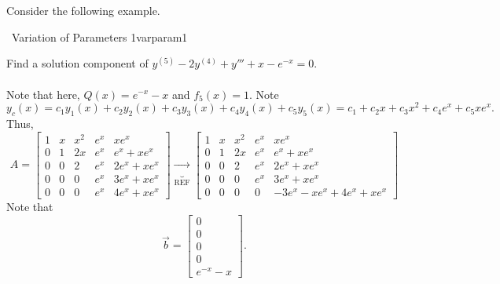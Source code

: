         \\
        \\
        Consider the following example.
        \begin{example}{\Difficulty\,\Difficulty\,\,Variation of Parameters 1}{varparam1}

            Find a solution component of \(y^{(5)}-2y^{(4)}+y'''+x-e^{-x}=0\).
            \\
            \\
            Note that here, \(Q(x)=e^{-x}-x\) and \(f_5(x)=1\). Note
            \begin{equation*}
                y_c(x)=c_1y_1(x)+c_2y_2(x)+c_3y_3(x)+c_4y_4(x)+c_5y_5(x)=c_1+c_2x+c_3x^2+c_4e^x+c_5xe^x.
            \end{equation*}
            Thus,
            \begin{equation*}
                A=\begin{bmatrix}
                    1 & x & x^2 & e^x & xe^x \\
                    0 & 1 & 2x & e^x & e^x+xe^x \\
                    0 & 0 & 2 & e^x & 2e^x+xe^x \\
                    0 & 0 & 0 & e^x & 3e^x+xe^x \\
                    0 & 0 & 0 &  e^x & 4e^x+xe^x
                \end{bmatrix}\underbrace{\to}_{\text{REF}}\begin{bmatrix}
                    1 & x & x^2 & e^x & xe^x \\
                    0 & 1 & 2x & e^x & e^x+xe^x \\
                    0 & 0 & 2 & e^x & 2e^x+xe^x \\
                    0 & 0 & 0 & e^x & 3e^x+xe^x \\
                    0 & 0 & 0 & 0 & -3e^x-xe^x+4e^x+xe^x
                \end{bmatrix}
            \end{equation*}
            Note that
            \begin{equation*}
                \vec{b}=\begin{bmatrix}
                    0 \\ 0 \\ 0 \\ 0 \\ e^{-x}-x
                \end{bmatrix}.
            \end{equation*}

\end{example}
